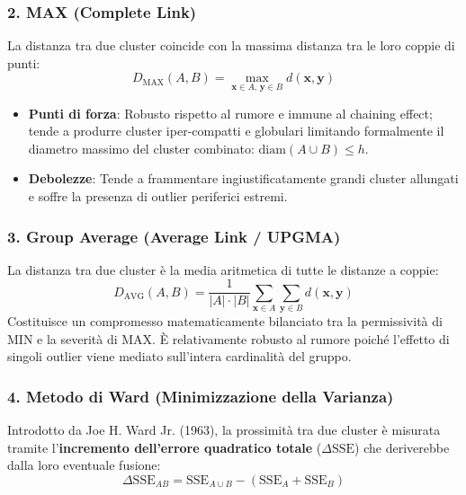 \subsubsection{2. MAX (Complete Link)}
La distanza tra due cluster coincide con la massima distanza tra le loro coppie di punti:
\begin{equation}
    D_{\text{MAX}}(A, B) = \max_{\mathbf{x} \in A, \, \mathbf{y} \in B} d(\mathbf{x}, \mathbf{y})
    \label{eq:dm-complete-link}
\end{equation}
\begin{itemize}[noitemsep]
    \item \textbf{Punti di forza}: Robusto rispetto al rumore e immune al chaining effect; tende a produrre cluster iper-compatti e globulari limitando formalmente il diametro massimo del cluster combinato: $\text{diam}(A \cup B) \le h$.
    \item \textbf{Debolezze}: Tende a frammentare ingiustificatamente grandi cluster allungati e soffre la presenza di outlier periferici estremi.
\end{itemize}

\subsubsection{3. Group Average (Average Link / UPGMA)}
La distanza tra due cluster è la media aritmetica di tutte le distanze a coppie:
\begin{equation}
    D_{\text{AVG}}(A, B) = \frac{1}{|A| \cdot |B|} \sum_{\mathbf{x} \in A} \sum_{\mathbf{y} \in B} d(\mathbf{x}, \mathbf{y})
    \label{eq:dm-average-link}
\end{equation}
Costituisce un compromesso matematicamente bilanciato tra la permissività di MIN e la severità di MAX. È relativamente robusto al rumore poiché l'effetto di singoli outlier viene mediato sull'intera cardinalità del gruppo.

\subsubsection{4. Metodo di Ward (Minimizzazione della Varianza)}
Introdotto da Joe H. Ward Jr. (1963), la prossimità tra due cluster è misurata tramite l'\textbf{incremento dell'errore quadratico totale} ($\Delta \mathrm{SSE}$) che deriverebbe dalla loro eventuale fusione:
\begin{equation}
    \Delta \mathrm{SSE}_{AB} = \mathrm{SSE}_{A \cup B} - (\mathrm{SSE}_A + \mathrm{SSE}_B)
    \label{eq:dm-ward-delta-def}
\end{equation}

